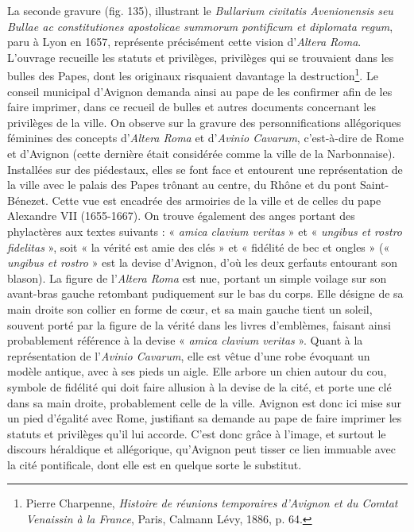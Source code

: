 \documentclass[12pt,twoside,openany]{book}
\begin{document}
La seconde gravure (fig. 135), illustrant le \textit{Bullarium civitatis Avenionensis seu Bullae ac constitutiones apostolicae summorum pontificum et diplomata regum}, paru à Lyon en 1657, représente précisément cette vision d’\textit{Altera Roma}. L’ouvrage recueille les statuts et privilèges, privilèges qui se trouvaient dans les bulles des Papes, dont les originaux risquaient davantage la destruction\footnote{Pierre Charpenne, \textit{Histoire de réunions temporaires d’Avignon et du Comtat Venaissin à la France}, Paris, Calmann Lévy, 1886, p. 64.}. Le conseil municipal d’Avignon demanda ainsi au pape de les confirmer afin de les faire imprimer, dans ce recueil de bulles et autres documents concernant les privilèges de la ville. On observe sur la gravure des personnifications allégoriques féminines des concepts d’\textit{Altera Roma} et d’\textit{Avinio Cavarum}, c’est-à-dire de Rome et d’Avignon (cette dernière était considérée comme la ville de la Narbonnaise). Installées sur des piédestaux, elles se font face et entourent une représentation de la ville avec le palais des Papes trônant au centre, du Rhône et du pont Saint-Bénezet. Cette vue est encadrée des armoiries de la ville et de celles du pape Alexandre VII (1655-1667). On trouve également des anges portant des phylactères aux textes suivants : « \textit{amica clavium veritas} » et « \textit{ungibus et rostro fidelitas} », soit « la vérité est amie des clés » et « fidélité de bec et ongles » (« \textit{ungibus et rostro} » est la devise d’Avignon, d’où les deux gerfauts entourant son blason). La figure de l’\textit{Altera Roma} est nue, portant un simple voilage sur son avant-bras gauche retombant pudiquement sur le bas du corps. Elle désigne de sa main droite son collier en forme de cœur, et sa main gauche tient un soleil, souvent porté par la figure de la vérité dans les livres d’emblèmes, faisant ainsi probablement référence à la devise « \textit{amica clavium veritas} ». Quant à la représentation de l’\textit{Avinio Cavarum}, elle est vêtue d’une robe évoquant un modèle antique, avec à ses pieds un aigle. Elle arbore un chien autour du cou, symbole de fidélité qui doit faire allusion à la devise de la cité, et porte une clé dans sa main droite, probablement celle de la ville. Avignon est donc ici mise sur un pied d’égalité avec Rome, justifiant sa demande au pape de faire imprimer les statuts et privilèges qu’il lui accorde. C’est donc grâce à l’image, et surtout le discours héraldique et allégorique, qu’Avignon peut tisser ce lien immuable avec la cité pontificale, dont elle est en quelque sorte le substitut.
\end{document}
